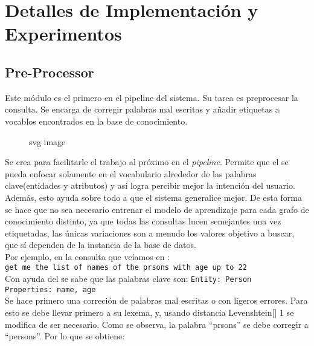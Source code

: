 \chapter{Detalles de Implementación y Experimentos}\label{chapter:implementation}


\section{Pre-Processor}
\label{pre-proc}
Este m\'odulo es el primero en el pipeline del sistema. Su tarea es preprocesar la consulta. Se encarga de corregir palabras mal escritas y añadir etiquetas a vocablos encontrados en la base de conocimiento.\\ 

\begin{figure}[htbp]
  \centering
  
  \caption{svg image}
\end{figure}

Se crea para facilitarle el trabajo al pr\'oximo en el \textit{pipeline}. Permite que el  se pueda enfocar solamente en el vocabulario alrededor de las palabras clave(entidades y atributos) y as\'i logra percibir mejor la intención del usuario.\\

Adem\'as, esto ayuda sobre todo a que el sistema generalice mejor. De esta forma se hace que no sea necesario entrenar el modelo de aprendizaje para cada grafo de conocimiento distinto, ya que todas las consultas lucen semejantes una vez etiquetadas, las \'unicas variaciones son a menudo los valores objetivo a buscar, que s\'i dependen de la instancia de la base de datos.\\

Por ejemplo, en la consulta que ve\'iamos en :\\
\verb|get me the list of names of the prsons with age up to 22|\\

Con ayuda del  se sabe que las palabras clave son:
\verb|Entity: Person|\\
\verb|Properties: name, age|\\


Se hace primero una correción de palabras mal escritas o con ligeros errores. Para esto se debe llevar primero a su lexema, y, usando distancia Levenshtein[] 1 se modifica de ser necesario. Como se observa, la palabra ``prsons'' se debe corregir a ``persons''.  Por lo que se obtiene: \\

